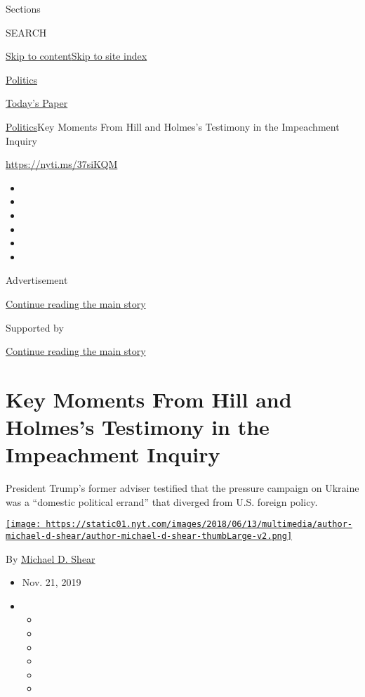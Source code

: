 Sections

SEARCH

\protect\hyperlink{site-content}{Skip to
content}\protect\hyperlink{site-index}{Skip to site index}

\href{https://www.nytimes.com/section/politics}{Politics}

\href{https://myaccount.nytimes.com/auth/login?response_type=cookie\&client_id=vi}{}

\href{https://www.nytimes.com/section/todayspaper}{Today's Paper}

\href{/section/politics}{Politics}\textbar{}Key Moments From Hill and
Holmes's Testimony in the Impeachment Inquiry

\url{https://nyti.ms/37siKQM}

\begin{itemize}
\item
\item
\item
\item
\item
\item
\end{itemize}

Advertisement

\protect\hyperlink{after-top}{Continue reading the main story}

Supported by

\protect\hyperlink{after-sponsor}{Continue reading the main story}

\hypertarget{key-moments-from-hill-and-holmess-testimony-in-the-impeachment-inquiry}{%
\section{Key Moments From Hill and Holmes's Testimony in the Impeachment
Inquiry}\label{key-moments-from-hill-and-holmess-testimony-in-the-impeachment-inquiry}}

President Trump's former adviser testified that the pressure campaign on
Ukraine was a ``domestic political errand'' that diverged from U.S.
foreign policy.

\href{https://www.nytimes.com/by/michael-d-shear}{\texttt{[image: https://static01.nyt.com/images/2018/06/13/multimedia/author-michael-d-shear/author-michael-d-shear-thumbLarge-v2.png]}}

By \href{https://www.nytimes.com/by/michael-d-shear}{Michael D. Shear}

\begin{itemize}
\item
  Nov. 21, 2019
\item
  \begin{itemize}
  \item
  \item
  \item
  \item
  \item
  \item
  \end{itemize}
\end{itemize}

